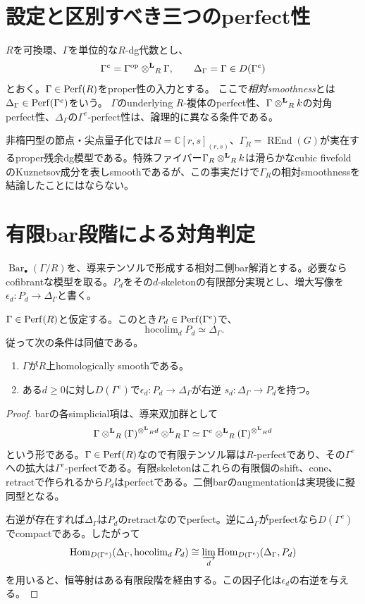 \section{設定と区別すべき三つのperfect性}
$R$を可換環、$\Gamma$を単位的な$R$-dg代数とし、
\[
 \Gamma^e=\Gamma^{\mathrm{op}}\mathbin{\otimes^{\mathbf L}}_R\Gamma,\qquad
 \Delta_\Gamma=\Gamma\in D(\Gamma^e)
\]
とおく。$\Gamma\in\operatorname{Perf}(R)$をproper性の入力とする。
ここで\emph{相対smoothness}とは$\Delta_\Gamma\in\operatorname{Perf}(\Gamma^e)$をいう。
$\Gamma$のunderlying $R$-複体のperfect性、$\Gamma\mathbin{\otimes^{\mathbf L}}_Rk$の対角perfect性、$\Delta_\Gamma$の$\Gamma^e$-perfect性は、論理的に異なる条件である。

非楕円型の節点・尖点量子化では$R=\mathbb C[r,s]_{(r,s)}$、$\Gamma_R=\operatorname{REnd}(G)$が実在するproper残余dg模型である。特殊ファイバー$\Gamma_R\mathbin{\otimes^{\mathbf L}}_Rk$は滑らかなcubic fivefoldのKuznetsov成分を表しsmoothであるが、この事実だけで$\Gamma_R$の相対smoothnessを結論したことにはならない。

\section{有限bar段階による対角判定}
$\operatorname{Bar}_\bullet(\Gamma/R)$を、導来テンソルで形成する相対二側bar解消とする。必要ならcofibrantな模型を取る。$P_d$をその$d$-skeletonの有限部分実現とし、増大写像を$\epsilon_d:P_d\to\Delta_\Gamma$と書く。

\begin{proposition}[有限段階のretract判定]\label{prop:bar}
$\Gamma\in\operatorname{Perf}(R)$と仮定する。このとき$P_d\in\operatorname{Perf}(\Gamma^e)$で、
\[
 \operatorname{hocolim}_{d}P_d\simeq\Delta_\Gamma.
\]
従って次の条件は同値である。
\begin{enumerate}
\item $\Gamma$が$R$上homologically smoothである。
\item ある$d\ge0$に対し$D(\Gamma^e)$で$\epsilon_d:P_d\to\Delta_\Gamma$が右逆
$s_d:\Delta_\Gamma\to P_d$を持つ。
\end{enumerate}
\end{proposition}
\begin{proof}
barの各simplicial項は、導来双加群として
\[
 \Gamma\mathbin{\otimes^{\mathbf L}}_R(\Gamma)^{\mathbin{\otimes^{\mathbf L}}_R d}\mathbin{\otimes^{\mathbf L}}_R\Gamma
 \simeq \Gamma^e\mathbin{\otimes^{\mathbf L}}_R (\Gamma)^{\mathbin{\otimes^{\mathbf L}}_R d}
\]
という形である。$\Gamma\in\operatorname{Perf}(R)$なので有限テンソル冪は$R$-perfectであり、その$\Gamma^e$への拡大は$\Gamma^e$-perfectである。有限skeletonはこれらの有限個のshift、cone、retractで作られるから$P_d$はperfectである。二側barのaugmentationは実現後に擬同型となる。

右逆が存在すれば$\Delta_\Gamma$は$P_d$のretractなのでperfect。逆に$\Delta_\Gamma$がperfectなら$D(\Gamma^e)$でcompactである。したがって
\[
 \operatorname{Hom}_{D(\Gamma^e)}
 (\Delta_\Gamma,\operatorname{hocolim}_d P_d)
 \cong \varinjlim_d\operatorname{Hom}_{D(\Gamma^e)}(\Delta_\Gamma,P_d)
\]
を用いると、恒等射はある有限段階を経由する。この因子化は$\epsilon_d$の右逆を与える。
\end{proof}

